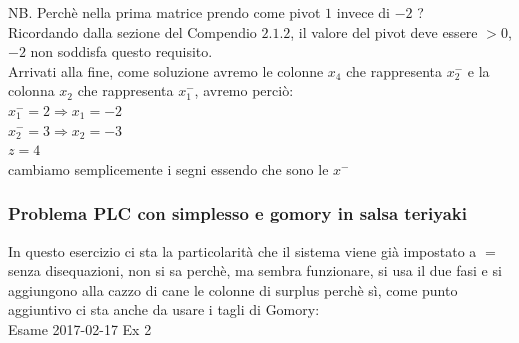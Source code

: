 \documentclass{article}
\begin{document}
NB. Perchè nella prima matrice prendo come pivot $1$ invece di $-2$ ?\\
Ricordando dalla sezione del Compendio $2.1.2$, il valore del pivot deve essere $>0$, $-2$ non soddisfa questo requisito.\\
Arrivati alla fine, come soluzione avremo le colonne $x_4$ che rappresenta $x_2^-$ e la colonna $x_2$ che rappresenta $x_1^-$, avremo perciò:\\
$x_1^-=2 \Rightarrow x_1 = -2$ \\
$x_2^-=3 \Rightarrow x_2 = -3$\\
$z = 4$\\
cambiamo semplicemente i segni essendo che sono le $x^-$\\

\newpage
\subsubsection{Problema PLC con simplesso e gomory in salsa teriyaki}
In questo esercizio ci sta la particolarità che il sistema viene già impostato a $ = $ senza disequazioni, non si sa perchè, ma sembra funzionare, si usa il due fasi e si aggiungono alla cazzo di cane le colonne di surplus perchè sì, come punto aggiuntivo ci sta anche da usare i tagli di Gomory:\\
Esame 2017-02-17 Ex 2\\
\noindent{}%
\end{document}
